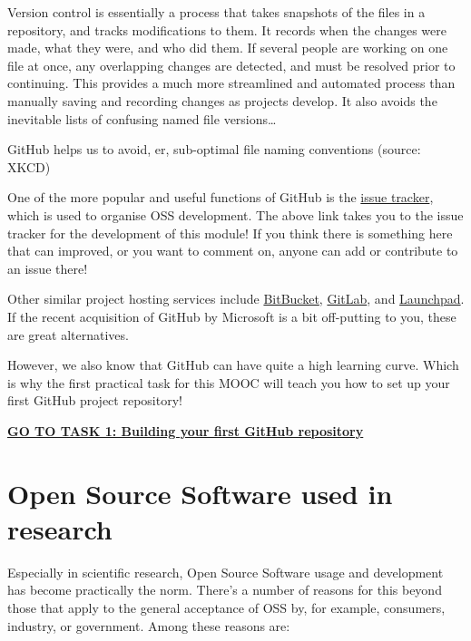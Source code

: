 \documentclass[]{book}
\begin{document}
Version control is essentially a process that takes snapshots of the files in a repository, and tracks modifications to them. It records when the changes were made, what they were, and who did them. If several people are working on one file at once, any overlapping changes are detected, and must be resolved prior to continuing. This provides a much more streamlined and automated process than manually saving and recording changes as projects develop. It also avoids the inevitable lists of confusing named file versions\ldots{}

GitHub helps us to avoid, er, sub-optimal file naming conventions (source: XKCD)

One of the more popular and useful functions of GitHub is the \href{https://github.com/OpenScienceMOOC/Module-5-Open-Research-Software-and-Open-Source/issues}{issue tracker}, which is used to organise OSS development. The above link takes you to the issue tracker for the development of this module! If you think there is something here that can improved, or you want to comment on, anyone can add or contribute to an issue there!

Other similar project hosting services include \href{https://bitbucket.org/}{BitBucket}, \href{https://about.gitlab.com/}{GitLab}, and \href{https://launchpad.net/}{Launchpad}. If the recent acquisition of GitHub by Microsoft is a bit off-putting to you, these are great alternatives.

However, we also know that GitHub can have quite a high learning curve. Which is why the first practical task for this MOOC will teach you how to set up your first GitHub project repository!

\textbf{\href{https://github.com/OpenScienceMOOC/Module-5-Open-Research-Software-and-Open-Source/blob/master/content_development/Task_1.md}{GO TO TASK 1: Building your first GitHub repository}}

\hypertarget{open-source-software-used-in-research}{%
\section{Open Source Software used in research }\label{open-source-software-used-in-research}}

Especially in scientific research, Open Source Software usage and development has become practically the norm. There's a number of reasons for this beyond those that apply to the general acceptance of OSS by, for example, consumers, industry, or government. Among these reasons are:
\end{document}
